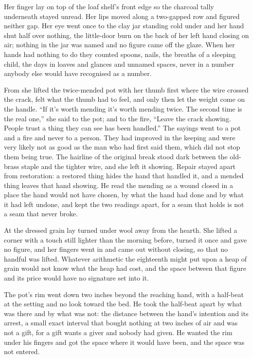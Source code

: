 Her finger lay on top of the loaf shelf's front edge so the charcoal tally underneath stayed unread. Her lips moved along a two-gapped row and figured neither gap. Her eye went once to the clay jar standing cold under  and her hand shut half over nothing, the little-door burn on the back of her left hand closing on air; nothing in the jar was named and no figure came off the glaze. When her hands had nothing to do they counted spoons, nails, the breaths of a sleeping child, the days in loaves and glances and unnamed spaces, never in a number anybody else would have recognised as a number.

From  she lifted the twice-mended pot with her thumb first where the wire crossed the crack, felt what the thumb had to feel, and only then let the weight come on the handle. “If it's worth mending it's worth mending twice. The second time is the real one,” she said to the pot; and to the fire, “Leave the crack showing. People trust a thing they can see has been handled.” The sayings went to a pot and a fire and never to a person. They had improved in the keeping and were very likely not as good as the man who had first said them, which did not stop them being true. The hairline of the original break stood dark between the old-brass staple and the tighter wire, and she left it showing. Repair stayed apart from restoration: a restored thing hides the hand that handled it, and a mended thing leaves that hand showing. He read the mending as a wound closed in a place the hand would not have chosen, by what the hand had done and by what it had left undone, and kept the two readings apart, for a seam that holds is not a seam that never broke.

At  the dressed grain lay turned under wool away from the hearth. She lifted a corner with a touch still lighter than the morning before, turned it once and gave no figure, and her fingers went in and came out without closing, so that no handful was lifted. Whatever arithmetic the eighteenth might put upon a heap of grain would not know what the heap had cost, and the space between that figure and its price would have no signature set into it.

The pot's rim went down two inches beyond the reaching hand, with a half-beat at the setting and no look toward the bed. He took the half-beat apart by what was there and by what was not: the distance between the hand's intention and its arrest, a small exact interval that bought nothing at two inches of air and was not a gift, for a gift wants a giver and nobody had given. He wanted the rim under his fingers and got the space where it would have been, and the space was not entered.

